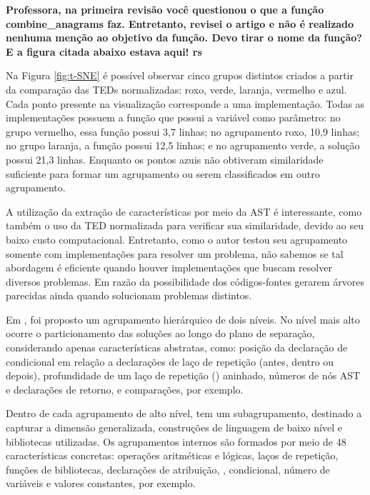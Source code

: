 	    \textbf{Professora, na primeira revisão você questionou o que a função
	    	combine\_anagrams faz. Entretanto, revisei o artigo e não é realizado
	    	nenhuma menção ao objetivo da função. Devo tirar o nome da função? E
	    	a figura citada abaixo estava aqui! rs}
	    
	    Na Figura \ref{fig:t-SNE} é possível observar cinco grupos distintos
	    criados a partir da comparação das TEDs normalizadas: roxo, verde, laranja,
	    vermelho e azul. Cada ponto presente na visualização corresponde a uma
	    implementação. Todas as implementações possuem a função 
	    que possui a variável  como parâmetro: no grupo vermelho,
	    essa função possui 3,7 linhas; no agrupamento roxo, 10,9 linhas; no
	    grupo laranja, a função possui 12,5 linhas; e no agrupamento verde,
	    a solução possui 21,3 linhas. Enquanto os pontos azuis não obtiveram
	    similaridade suficiente para formar um agrupamento ou serem classificados
	    em outro agrupamento. 

		A utilização da extração de características por meio da AST é interessante,
		como também o uso da TED normalizada para verificar sua similaridade, devido
		ao seu baixo custo computacional. Entretanto, como o autor testou seu
		agrupamento somente com implementações para resolver um problema, não sabemos
		se tal abordagem é eficiente quando houver implementações que buscam resolver
		diversos problemas. Em razão da possibilidade dos códigos-fontes gerarem
		árvores parecidas ainda quando solucionam problemas distintos.
	    
	    Em , foi proposto um agrupamento hierárquico de dois
	    níveis. No nível mais alto ocorre o particionamento das soluções ao longo do
	    plano de separação, considerando apenas características abstratas, como:
	    posição da declaração de condicional em relação a declarações de laço de
	    repetição (antes, dentro ou depois), profundidade de um laço de repetição
	    () aninhado, números de nós AST e declarações de retorno,
	     e comparações, por exemplo.
	    
	    Dentro de cada agrupamento de alto nível, tem um subagrupamento, destinado a
	    capturar a dimensão generalizada, construções de linguagem de baixo nível e
	    bibliotecas utilizadas. Os agrupamentos internos são formados por meio de 48
	    características concretas: operações aritméticas e lógicas, laços de repetição,
	    funções de bibliotecas, declarações de atribuição, , condicional,
	    número de variáveis e valores constantes, por exemplo.
	    
